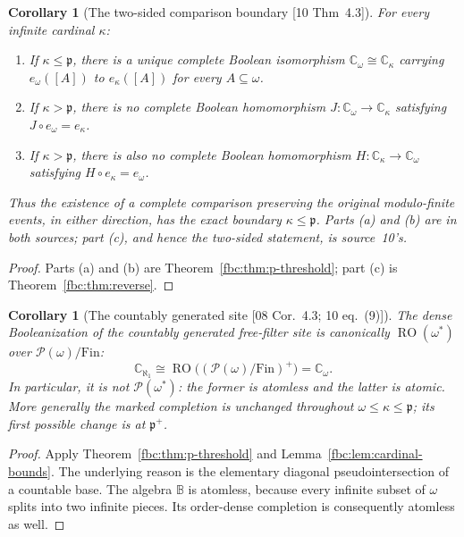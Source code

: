 \documentclass[11pt,letterpaper]{article}
\newtheorem{corollary}[theorem]{Corollary}
\theoremstyle{definition}
\theoremstyle{remark}
\newcommand{\om}{\omega}
\newcommand{\Fin}{\mathrm{Fin}}
\newcommand{\B}{\mathbb B}
\newcommand{\C}{\mathbb C}
\newcommand{\pow}{\mathcal P}
\newcommand{\cp}{\mathfrak p}
\newcommand{\RO}{\operatorname{RO}}
\newcommand{\src}[1]{\textup{[#1]}}
\begin{document}
\begin{corollary}[The two-sided comparison boundary \src{10 Thm~4.3}]
\label{fbc:cor:two-sided}
For every infinite cardinal $\kappa$:
\begin{enumerate}[label=\textup{(\alph*)}]
\item If $\kappa\leq\cp$, there is a unique complete Boolean isomorphism
$\C_\om\cong\C_\kappa$ carrying $e_\om([A])$ to $e_\kappa([A])$ for every
$A\subseteq\om$.
\item If $\kappa>\cp$, there is no complete Boolean homomorphism
$J:\C_\om\to\C_\kappa$ satisfying $J\circ e_\om=e_\kappa$.
\item If $\kappa>\cp$, there is also no complete Boolean
homomorphism $H:\C_\kappa\to\C_\om$ satisfying $H\circ e_\kappa=e_\om$.
\end{enumerate}
Thus the existence of a complete comparison preserving the original
modulo-finite events, in either direction, has the exact boundary
$\kappa\leq\cp$. Parts \textup{(a)} and \textup{(b)} are in both sources;
part \textup{(c)}, and hence the two-sided statement, is source~10's.
\end{corollary}
\begin{proof}
Parts (a) and (b) are Theorem~\ref{fbc:thm:p-threshold}; part (c) is
Theorem~\ref{fbc:thm:reverse}.
\end{proof}

\begin{corollary}[The countably generated site \src{08 Cor.~4.3; 10 eq.~(9)}]
\label{fbc:cor:countable}
The dense Booleanization of the countably generated free-filter site
is canonically $\RO(\om^*)$ over $\pow(\om)/\Fin$:
\begin{equation}\label{fbc:eq:cgcompletion}
 \C_{\aleph_1}\cong\RO\bigl((\pow(\om)/\Fin)^+\bigr)=\C_\om.
\end{equation}
In particular, it is not $\pow(\om^*)$: the former is atomless and the
latter is atomic. More generally the marked completion is unchanged
throughout $\om\leq\kappa\leq\cp$; its first possible change is at
$\cp^+$.
\end{corollary}
\begin{proof}
Apply Theorem~\ref{fbc:thm:p-threshold} and
Lemma~\ref{fbc:lem:cardinal-bounds}. The underlying reason is the
elementary diagonal pseudointersection of a countable base. The algebra
$\B$ is atomless, because every infinite subset of $\om$ splits into two
infinite pieces. Its order-dense completion is consequently atomless as
well.
\end{proof}
\end{document}
